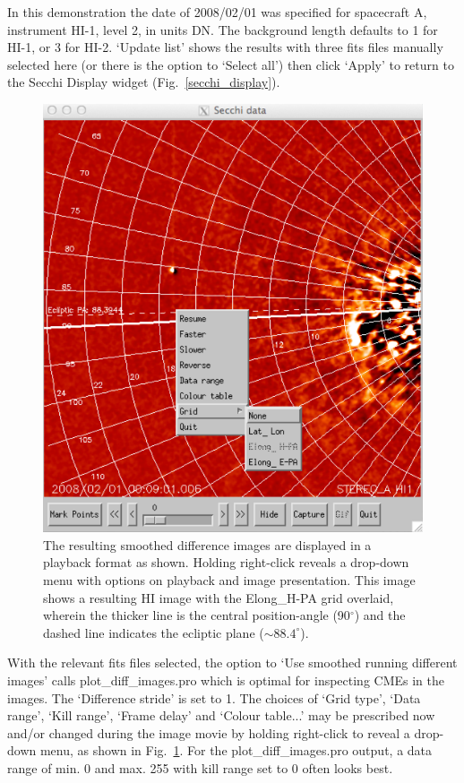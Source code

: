 \documentclass[12pt, a4paper, oneside]{article}
\begin{document}
In this demonstration the date of 2008/02/01 was specified for spacecraft A, instrument HI-1, level 2, in units DN. The background length defaults to 1 for HI-1, or 3 for HI-2. `Update list' shows the results with three fits files manually selected here (or there is the option to `Select all') then click `Apply' to return to the Secchi Display widget (Fig.~\ref{secchi_display}).

\begin{figure}[]
\centering
\includegraphics[scale=0.75]{../images/hi_image_movie.png}
\caption{The resulting smoothed difference images are displayed in a playback format as shown. Holding right-click reveals a drop-down menu with options on playback and image presentation. This image shows a resulting HI image with the Elong\_H-PA grid overlaid, wherein the thicker line is the central position-angle (90$^{\circ}$) and the dashed line indicates the ecliptic plane ($\sim88.4^{\circ}$).}
\label{hi_image_movie}
\end{figure}

With the relevant fits files selected, the option to `Use smoothed running different images' calls plot\_diff\_images.pro which is optimal for inspecting CMEs in the images. The `Difference stride' is set to 1. The choices of `Grid type', `Data range', `Kill range', `Frame delay' and `Colour table...' may be prescribed now and/or changed during the image movie by holding right-click to reveal a drop-down menu, as shown in Fig.~\ref{hi_image_movie}. For the plot\_diff\_images.pro output, a data range of min. 0 and max. 255 with kill range set to 0 often looks best.
\end{document}
